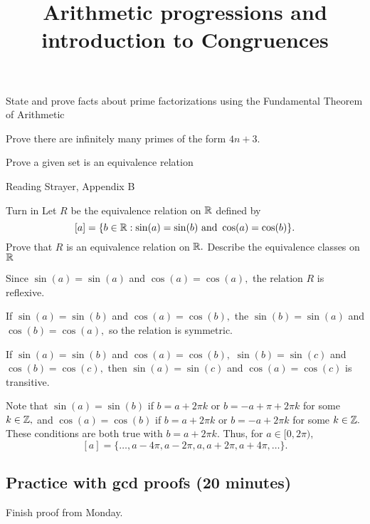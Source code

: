 \documentclass{../ximera}
\title{Arithmetic progressions and introduction to Congruences}
\begin{document}
\begin{abstract}
\end{abstract}
\maketitle

\begin{obj}
    \item State and prove facts about prime factorizations using the Fundamental Theorem of Arithmetic
    \item Prove there are infinitely many primes of the form $4n+3$.
    \item Prove a given set is an equivalence relation
\end{obj}

\begin{pre}
    \item[Reading] Strayer, Appendix B
    \item[Turn in] Let $R$ be the equivalence relation on $\mathbb R$
    defined by
    \[
   [a]=\{b\in\mathbb R:\sin(a)=\sin(b) \textnormal{ and }\cos(a)=\cos(b)\}.\]
     Prove that $R$ is an equivalence relation on $\mathbb R.$
   Describe the equivalence classes on $\mathbb R$
   
   \begin{solution}
        Since $\sin(a)=\sin(a)$ and $\cos(a)=\cos(a),$ the relation $R$ is reflexive.

        If $\sin(a)=\sin(b)$ and $\cos(a)=\cos(b),$ the $\sin(b)=\sin(a)$ and $\cos(b)=\cos(a),$ so the relation is symmetric.

        If $\sin(a)=\sin(b)$ and $\cos(a)=\cos(b),$ $\sin(b)=\sin(c)$ and $\cos(b)=\cos(c),$ then $\sin(a)=\sin(c)$ and $\cos(a)=\cos(c)$ is transitive.

        Note that $\sin(a)=\sin(b)$ if $b=a+2\pi k$ or $b=-a+\pi+2\pi k$ for some $k\in\mathbb Z,$ and  $\cos(a)=\cos(b)$ if $b=a+2\pi k$ or $b=-a+2\pi k$ for some $k\in\mathbb Z.$ These conditions are both true with $b=a+2\pi k$. Thus, for $a\in[0,2\pi),$
        \[
            [a]=\{\dots,a-4\pi,a-2\pi,a,a+2\pi,a+4\pi,\dots\}.
        \]
       \end{solution}
\end{pre}
\subsection{Practice with gcd proofs (20 minutes)}
Finish proof from Monday.
\end{document}
